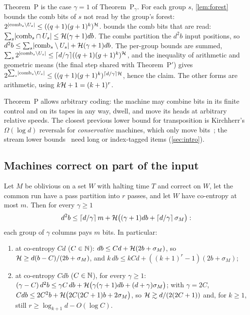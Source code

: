 \begin{outline}
Theorem~P is the case $\gamma=1$ of Theorem~P$_\gamma$. For each group $s$, \cref{lem:forest}
bounds the comb bits of $s$ not read by the group's forest:
$2^{\lvert \mathrm{comb}_s\setminus U_s \rvert}\le((q+1)(g+1)^k)^{\mathcal{H}}$.  bounds
the comb bits that are read: $\sum_s\lvert \mathrm{comb}_s\cap U_s \rvert\le\mathcal{H}(\gamma+1)db$. The combs
partition the $d^2b$ input positions, so
$d^2b\le\sum_s\lvert \mathrm{comb}_s\setminus U_s \rvert+\mathcal{H}(\gamma+1)db$. The per-group bounds are summed,
$\sum_s2^{\lvert \mathrm{comb}_s\setminus U_s \rvert}\le\lceil d/\gamma\rceil((q+1)(g+1)^k)^{\mathcal{H}}$, and the
inequality of arithmetic and geometric means (the final step shared with Theorem~P$'$) gives
$2^{\sum_s\lvert \mathrm{comb}_s\setminus U_s \rvert}\le((q+1)(g+1)^k)^{\lceil d/\gamma\rceil\mathcal{H}}$, hence the
claim. The other forms are arithmetic, using $k\mathcal{H}+1=(k+1)^r$.
\end{outline}

Theorem~P allows arbitrary coding: the machine may combine bits in its finite control and on its
tapes in any way, dwell, and move its heads at arbitrary relative speeds. The closest previous lower
bound for transposition is Kirchherr's $\Omega(\log d)$ reversals for \emph{conservative} machines, which
only move bits~\cite{Kirchherr1988}; the stream lower bounds~\cite{GroheSchweikardt2005,GHS2009} need long or
index-tagged items (\cref{sec:intro}).

\subsection{Machines correct on part of the input}

\begin{theorem}\label{thm:P-on}
Let $M$ be oblivious on a set $W$ with halting time $T$ and correct on $W$, let the common run
have a pass partition into $r$ passes, and let $W$ have co-entropy at most $m$. Then for every
$\gamma\ge1$
\[
  d^2b\le\lceil d/\gamma\rceil\,m+\mathcal{H}\bigl((\gamma+1)db+\lceil d/\gamma\rceil\,\sigma_M\bigr):
\]
each group of $\gamma$ columns pays $m$ bits. In particular:
\begin{enumerate}[label=(\alph*)]
\item at co-entropy $Cd$ ($C\in\mathbb{N}$): $db\le Cd+\mathcal{H}(2b+\sigma_M)$, so $\mathcal{H}\ge d(b-C)/(2b+\sigma_M)$, and
$k\,db\le kCd+((k+1)^r-1)(2b+\sigma_M)$;
\item at co-entropy $Cdb$ ($C\in\mathbb{N}$), for every $\gamma\ge1$:
$(\gamma-C)\,d^2b\le\gamma C\,db+\mathcal{H}\bigl(\gamma(\gamma+1)db+(d+\gamma)\sigma_M\bigr)$; with
$\gamma=2C$, $Cdb\le 2C^2b+\mathcal{H}\bigl(2C(2C+1)b+2\sigma_M\bigr)$, so
$\mathcal{H}\gtrsim d/(2(2C+1))$ and, for $k\ge1$, still $r\ge\log_{k+1}d-O(\log C)$.
\end{enumerate}
\end{theorem}

